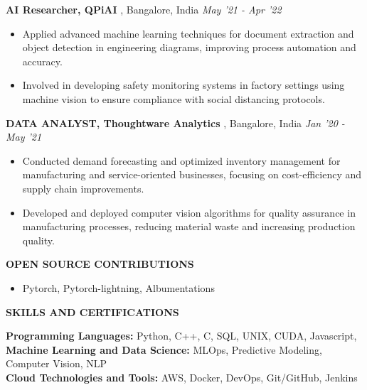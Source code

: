 \documentclass[10pt,a4]{article}
\begin{document}
{\begin{flushleft}
		\textbf{\large AI Researcher, QPiAI }, \large Bangalore, India \hfill \textit{\large May '21 - Apr '22}	\\
		\begin{itemize}
			  
			\item Applied advanced machine learning techniques for document extraction and object detection in engineering diagrams, improving process automation and accuracy.
			\item Involved in developing safety monitoring systems in factory settings using machine vision to ensure compliance with social distancing protocols.
        \end{itemize}		

		\textbf{\large DATA ANALYST, Thoughtware Analytics }, \large Bangalore, India \hfill \textit{\large Jan '20 - May '21}	\\		
		\begin{itemize}
			  
			\item Conducted demand forecasting and optimized inventory management for manufacturing and service-oriented businesses, focusing on cost-efficiency and supply chain improvements.
			\item Developed and deployed computer vision algorithms for quality assurance in manufacturing processes, reducing material waste and increasing production quality.   
        \end{itemize}	

        \textbf{\large OPEN SOURCE CONTRIBUTIONS}
        \begin{itemize}
            \item Pytorch, Pytorch-lightning, Albumentations
        \end{itemize}
\end{flushleft}



\begin{flushleft}
    {\Large \textbf {SKILLS AND CERTIFICATIONS}}
    
        \vspace{1mm}
        \begin{itemize}
            \hspace{0.5cm} \large \textbf{Programming Languages:} Python, C++, C, SQL, UNIX, CUDA, Javascript,  \\
            \hspace{0.5cm} \large \textbf{Machine Learning and Data Science:} MLOps, Predictive Modeling, Computer Vision, NLP   \\
            \hspace{0.5cm} \large \textbf{Cloud Technologies and Tools:} AWS, Docker, DevOps, Git/GitHub, Jenkins  \\
        

\end{itemize}
\end{flushleft}}
\end{document}
